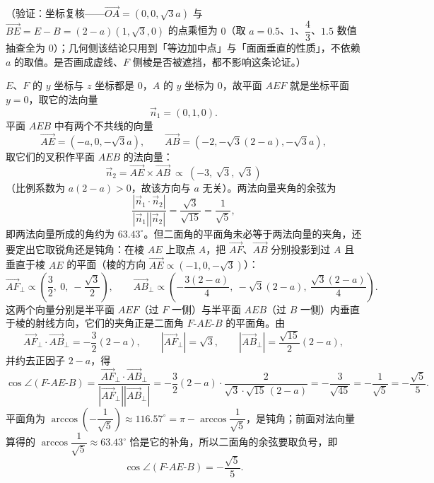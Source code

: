 \begin{answer}
（验证：坐标复核——\(\overrightarrow{OA}=(0,0,\sqrt{3}a)\) 与 \(\overrightarrow{BE}=E-B=(2-a)(1,\sqrt{3},0)\) 的点乘恒为 \(0\)（取 \(a=0.5\)、\(1\)、\(\dfrac{4}{3}\)、\(1.5\) 数值抽查全为 \(0\)）；几何侧该结论只用到「等边加中点」与「面面垂直的性质」，不依赖 \(a\) 的取值。是否画成虚线、\(F\) 侧棱是否被遮挡，都不影响这条论证。）


\(E\)、\(F\) 的 \(y\) 坐标与 \(z\) 坐标都是 \(0\)，\(A\) 的 \(y\) 坐标为 \(0\)，故平面 \(AEF\) 就是坐标平面 \(y=0\)，取它的法向量
\nopagebreak[4]
\[
\vec{n}_{1}=(0,1,0).
\]
平面 \(AEB\) 中有两个不共线的向量
\nopagebreak[4]
\[
\overrightarrow{AE}=(-a,0,-\sqrt{3}a),\qquad \overrightarrow{AB}=\left(-2,-\sqrt{3}(2-a),-\sqrt{3}a\right),
\]
取它们的叉积作平面 \(AEB\) 的法向量：
\nopagebreak[4]
\[
\vec{n}_{2}=\overrightarrow{AE}\times\overrightarrow{AB}\ \propto\ (-3,\ \sqrt{3},\ \sqrt{3})
\]
（比例系数为 \(a(2-a)>0\)，故该方向与 \(a\) 无关）。两法向量夹角的余弦为
\nopagebreak[4]
\[
\frac{\left|\vec{n}_{1}\cdot\vec{n}_{2}\right|}{\left|\vec{n}_{1}\right|\left|\vec{n}_{2}\right|}=\frac{\sqrt{3}}{\sqrt{15}}=\frac{1}{\sqrt{5}},
\]
即两法向量所成的角约为 \(63.43^{\circ}\)。但二面角的平面角未必等于两法向量的夹角，还要定出它取锐角还是钝角：在棱 \(AE\) 上取点 \(A\)，把 \(\overrightarrow{AF}\)、\(\overrightarrow{AB}\) 分别投影到过 \(A\) 且垂直于棱 \(AE\) 的平面（棱的方向 \(\overrightarrow{AE}\propto(-1,0,-\sqrt{3})\)）：
\nopagebreak[4]
\[
\overrightarrow{AF}_{\perp}\propto\left(\frac{3}{2},\ 0,\ -\frac{\sqrt{3}}{2}\right),\qquad
\overrightarrow{AB}_{\perp}\propto\left(-\frac{3(2-a)}{4},\ -\sqrt{3}(2-a),\ \frac{\sqrt{3}(2-a)}{4}\right).
\]
这两个向量分别是半平面 \(AEF\)（过 \(F\) 一侧）与半平面 \(AEB\)（过 \(B\) 一侧）内垂直于棱的射线方向，它们的夹角正是二面角 \(F\text{-}AE\text{-}B\) 的平面角。由
\nopagebreak[4]
\[
\overrightarrow{AF}_{\perp}\cdot\overrightarrow{AB}_{\perp}=-\frac{3}{2}(2-a),\qquad
\left|\overrightarrow{AF}_{\perp}\right|=\sqrt{3},\qquad
\left|\overrightarrow{AB}_{\perp}\right|=\frac{\sqrt{15}}{2}(2-a),
\]
并约去正因子 \(2-a\)，得
\nopagebreak[4]
\[
\cos\angle(F\text{-}AE\text{-}B)=\frac{\overrightarrow{AF}_{\perp}\cdot\overrightarrow{AB}_{\perp}}{\left|\overrightarrow{AF}_{\perp}\right|\left|\overrightarrow{AB}_{\perp}\right|}=-\frac{3}{2}(2-a)\cdot\frac{2}{\sqrt{3}\cdot\sqrt{15}\,(2-a)}=-\frac{3}{\sqrt{45}}=-\frac{1}{\sqrt{5}}=-\frac{\sqrt{5}}{5}.
\]
平面角为 \(\arccos\left(-\dfrac{1}{\sqrt{5}}\right)\approx116.57^{\circ}=\pi-\arccos\dfrac{1}{\sqrt{5}}\)，是钝角；前面对法向量算得的 \(\arccos\dfrac{1}{\sqrt{5}}\approx63.43^{\circ}\) 恰是它的补角，所以二面角的余弦要取负号，即
\nopagebreak[4]
\[
\cos\angle(F\text{-}AE\text{-}B)=-\frac{\sqrt{5}}{5}.
\]


\end{answer}
